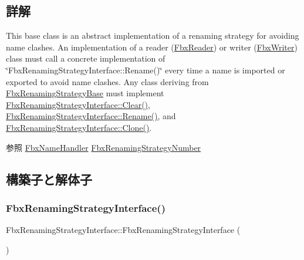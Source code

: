 \subsection{詳解}
This base class is an abstract implementation of a renaming strategy for avoiding name clashes. An implementation of a reader (\hyperlink{class_fbx_reader}{Fbx\+Reader}) or writer (\hyperlink{class_fbx_writer}{Fbx\+Writer}) class must call a concrete implementation of \char`\"{}\+Fbx\+Renaming\+Strategy\+Interface\+::\+Rename()\char`\"{} every time a name is imported or exported to avoid name clashes. Any class deriving from \hyperlink{class_fbx_renaming_strategy_base}{Fbx\+Renaming\+Strategy\+Base} must implement \hyperlink{class_fbx_renaming_strategy_interface_a2090b5ae43936b617ec5d75015923f69}{Fbx\+Renaming\+Strategy\+Interface\+::\+Clear()}, \hyperlink{class_fbx_renaming_strategy_interface_a1b91016c68dd9c7031624026fd39638a}{Fbx\+Renaming\+Strategy\+Interface\+::\+Rename()}, and \hyperlink{class_fbx_renaming_strategy_interface_ab394ed8a9b5d3ec40334bc933af83907}{Fbx\+Renaming\+Strategy\+Interface\+::\+Clone()}.

\begin{DoxySeeAlso}{参照}
\hyperlink{class_fbx_name_handler}{Fbx\+Name\+Handler} \hyperlink{class_fbx_renaming_strategy_number}{Fbx\+Renaming\+Strategy\+Number} 
\end{DoxySeeAlso}


\subsection{構築子と解体子}
\mbox{\label{class_fbx_renaming_strategy_interface_a4c211fabbf906c3e3102a17febe1a428}} 
\subsubsection{\texorpdfstring{Fbx\+Renaming\+Strategy\+Interface()}{FbxRenamingStrategyInterface()}}
{\footnotesize\ttfamily Fbx\+Renaming\+Strategy\+Interface\+::\+Fbx\+Renaming\+Strategy\+Interface (\begin{DoxyParamCaption}{ }\end{DoxyParamCaption})}



